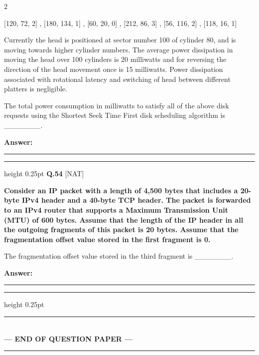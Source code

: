 \documentclass[a4paper,10pt,twoside]{article}
\begin{document}
\begin{multicols}{2}
{[120, 72, 2] , [180, 134, 1] , [60, 20, 0] , [212, 86, 3] , [56, 116, 2] , [118, 16, 1]
\par\smallskip
Currently the head is positioned at sector number 100 of cylinder 80, and is moving towards
higher cylinder numbers. The average power dissipation in moving the head over 100
cylinders is 20 milliwatts and for reversing the direction of the head movement once is 15
milliwatts. Power dissipation associated with rotational latency and switching of head
between different platters is negligible.
\par\smallskip
The total power consumption in milliwatts to satisfy all of the above disk requests using the
Shortest Seek Time First disk scheduling algorithm is \_\_\_\_\_\_\_. \par}
\par\vspace{3pt}\noindent\textbf{Answer:} \rule{3.2cm}{0.4pt}
\par\vspace{6pt}\hrule height 0.25pt\vspace{6pt}
\noindent\textbf{Q.54} \hfill {\footnotesize\textsf{[NAT]}}
\par\vspace{2pt}
{\bfseries Consider an IP packet with a length of 4,500 bytes that includes a 20-byte IPv4 header and
a 40-byte TCP header. The packet is forwarded to an IPv4 router that supports a Maximum
Transmission Unit (MTU) of 600 bytes. Assume that the length of the IP header in all the
outgoing fragments of this packet is 20 bytes. Assume that the fragmentation offset value
stored in the first fragment is 0.
\par\smallskip
The fragmentation offset value stored in the third fragment is \_\_\_\_\_\_\_. \par}
\par\vspace{3pt}\noindent\textbf{Answer:} \rule{3.2cm}{0.4pt}
\par\vspace{6pt}\hrule height 0.25pt\vspace{6pt}
\end{multicols}
\vspace{8pt}
\begin{center}
\rule{0.35\linewidth}{0.5pt}\\[2pt]
\textbf{\small --- END OF QUESTION PAPER ---}\\[-8pt]
\rule{0.35\linewidth}{0.5pt}
\end{center}
\vspace{10pt}
\end{document}

